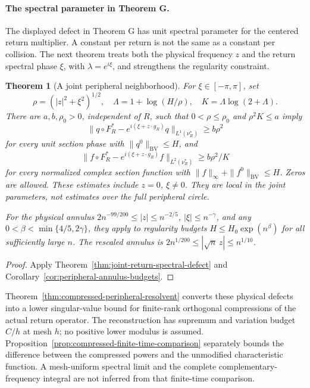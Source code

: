 \documentclass[11pt,reqno]{amsart}
\numberwithin{equation}{section}
\newtheorem{maintheorem}{Theorem}
\theoremstyle{definition}\newtheorem{definition}[theorem]{Definition}
\theoremstyle{remark}\newtheorem{remark}[theorem]{Remark}
\begin{document}
\paragraph{The spectral parameter in Theorem G.}
The displayed defect in Theorem G has unit spectral parameter for the
centered return multiplier. A constant per return is not the same as a
constant per collision. The next theorem treats both the physical
frequency $z$ and the return spectral phase $\xi$, with
$\lambda=e^{i\xi}$, and strengthens the regularity constraint.

\begin{maintheorem}[A joint peripheral neighborhood]
\label{thm:intro-peripheral-neighborhood}
For $\xi\in[-\pi,\pi]$, set
\[
 \rho=(|z|^2+\xi^2)^{1/2},\quad
 \Lambda=1+\log(H/\rho),\quad K=\Lambda\log(2+\Lambda).
\]
There are $a,b,\rho_0>0$, independent of $R$, such that
$0<\rho\le\rho_0$ and $\rho^2K\le a$ imply
\[
 \|q\circ F_R^*-e^{i(\xi+z\cdot g_R)}q\|_{L^1(\nu_R^*)}
       \ge b\rho^2
\]
for every unit section phase with $\|q^0\|_{\mathrm{BV}}\le H$,
and
\[
 \|f\circ F_R^*-e^{i(\xi+z\cdot g_R)}f\|_{L^2(\nu_R^*)}
       \ge b\rho^2/K
\]
for every normalized complex section function with
$\|f\|_\infty+\|f^0\|_{\mathrm{BV}}\le H$. Zeros are allowed.
These estimates include $z=0$, $\xi\ne0$. They are local in the joint
parameters, not estimates over the full peripheral circle.

For the physical annulus $2n^{-99/200}\le|z|\le n^{-2/5}$,
$|\xi|\le n^{-\gamma}$, and any
$0<\beta<\min\{4/5,2\gamma\}$, they apply to regularity budgets
$H\le H_0\exp(n^\beta)$ for all sufficiently large $n$.
The rescaled annulus is $2n^{1/200}\le|\sqrt n\,z|\le n^{1/10}$.
\end{maintheorem}
\begin{proof}
Apply Theorem~\ref{thm:joint-return-spectral-defect} and
Corollary~\ref{cor:peripheral-annulus-budgets}.
\end{proof}

Theorem~\ref{thm:compressed-peripheral-resolvent} converts these physical
defects into a lower singular-value bound for finite-rank orthogonal
compressions of the actual return operator. The reconstruction has
supremum and variation budget $C/h$ at mesh $h$; no positive lower
modulus is assumed. Proposition~\ref{prop:compressed-finite-time-comparison}
separately bounds the difference between the compressed powers and the
unmodified characteristic function. A mesh-uniform spectral limit and
the complete complementary-frequency integral are not inferred from
that finite-time comparison.
\end{document}
